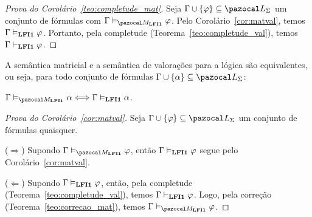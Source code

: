     \begin{proof}[Prova do Corolário~\ref{teo:completude_mat}]
        Seja $\Gamma \cup \{\phi\} \subseteq \ling{}$ um conjunto de fórmulas com $\Gamma \conmat \phi$. Pelo Corolário~\ref{cor:matval}, temos $\Gamma \vDash_{{\normalfont\textbf{LFI1}}{}} \varphi$. Portanto, pela completude (Teorema~\ref{teo:completude_val}), temos $\Gamma \vdash_{{\normalfont\textbf{LFI1}}{}} \varphi$.
    \end{proof}


    \begin{corolario}\label{cor:matvaleq}
        A semântica matricial e a semântica de valorações para a lógica {\normalfont\lfium{}} são equivalentes, ou seja, para todo conjunto de fórmulas $\Gamma \cup \{\alpha\} \subseteq \ling{}$:

        \centering
        {\normalfont{} $\Gamma \conmat \alpha \Longleftrightarrow \Gamma \conval \alpha$.}

    \end{corolario}

    \begin{proof}[Prova do Corolário~\ref{cor:matval}]
        Seja $\Gamma \cup \{\phi\} \subseteq \ling{}$ um conjunto de fórmulas quaisquer.

        \noindent ($\Longrightarrow$) Supondo $\Gamma \conmat \phi$, então $\Gamma \vDash_{{\normalfont\textbf{LFI1}}{}} \varphi$ segue pelo Corolário~\ref{cor:matval}.

        \noindent ($\Longleftarrow$) Supondo $\Gamma \vDash_{{\normalfont\textbf{LFI1}}{}} \varphi$, então, pela completude (Teorema~\ref{teo:completude_val}), temos $\Gamma \vdash_{{\normalfont\textbf{LFI1}}{}} \varphi$. Logo, pela correção (Teorema~\ref{teo:correcao_mat}), temos $\Gamma \conmat \phi$.

    \end{proof}